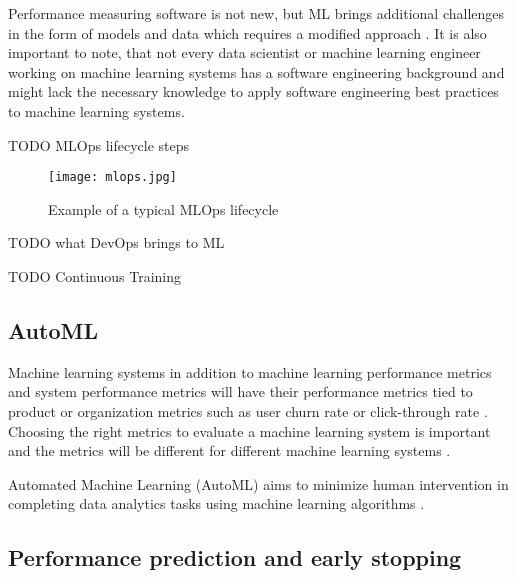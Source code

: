 Performance measuring software is not new, but ML brings additional challenges in the form of models and data which requires a modified approach \parencite{breckMLTestScore2017a}. It is also important to note, that not every data scientist or machine learning engineer working on machine learning systems has a software engineering background \parencite{finzerDataScienceEducation2013} and might lack the necessary knowledge to apply software engineering best practices to machine learning systems.

TODO MLOps lifecycle steps

\begin{figure}[h]
    \centering
    \texttt{[image: mlops.jpg]}
    \caption{Example of a typical MLOps lifecycle}
    \label{fig:mlops}
\end{figure}

TODO what DevOps brings to ML

TODO Continuous Training

\subsection{AutoML}

Machine learning systems in addition to machine learning performance metrics and system performance metrics will have their performance metrics tied to product or organization metrics such as user churn rate or click-through rate \parencite{shankarOperationalizingMachineLearning2022}. Choosing the right metrics to evaluate a machine learning system is important and the metrics will be different for different machine learning systems \parencite{shankarOperationalizingMachineLearning2022}.

Automated Machine Learning (AutoML) aims to minimize human intervention in completing data analytics tasks using machine learning algorithms \parencite{yangIoTDataAnalytics2022}.

\subsection{Performance prediction and early stopping}

